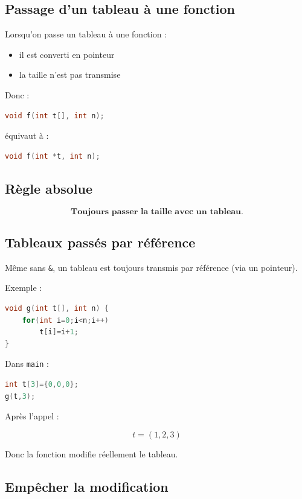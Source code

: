 \subsection{Passage d’un tableau à une fonction}

Lorsqu’on passe un tableau à une fonction :

\begin{itemize}
    \item il est converti en pointeur
    \item la taille n’est pas transmise
\end{itemize}

Donc :

\begin{lstlisting}[language=C]
void f(int t[], int n);
\end{lstlisting}

équivaut à :

\begin{lstlisting}[language=C]
void f(int *t, int n);
\end{lstlisting}

\subsection{Règle absolue}

\[
\textbf{Toujours passer la taille avec un tableau.}
\]

\subsection{Tableaux passés par référence}

Même sans \texttt{\&}, un tableau est toujours transmis
par référence (via un pointeur).

Exemple :

\begin{lstlisting}[language=C]
void g(int t[], int n) {
    for(int i=0;i<n;i++)
        t[i]=i+1;
}
\end{lstlisting}

Dans \texttt{main} :

\begin{lstlisting}[language=C]
int t[3]={0,0,0};
g(t,3);
\end{lstlisting}

Après l’appel :

\[
t = (1,2,3)
\]

Donc la fonction modifie réellement le tableau.

\subsection{Empêcher la modification}

